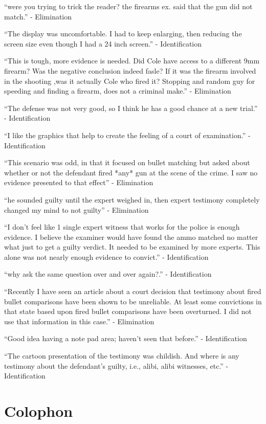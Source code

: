 \documentclass[print]{nuthesis}
\begin{document}
``were you trying to trick the reader? the firearms ex. said that the gun did not match.'' - Elimination

``The display was uncomfortable. I had to keep enlarging, then reducing the screen size even though I had a 24 inch screen.'' - Identification

``This is tough, more evidence is needed. Did Cole have access to a different 9mm firearm? Was the negative conclusion indeed fasle? If it was the firearm involved in the shooting ,was it actually Cole who fired it? Stopping and random guy for speeding and finding a firearm, does not a criminal make.'' - Elimination

``The defense was not very good, so I think he has a good chance at a new trial.'' - Identification

``I like the graphics that help to create the feeling of a court of examination.'' - Identification

``This scenario was odd, in that it focused on bullet matching but asked about whether or not the defendant fired *any* gun at the scene of the crime. I saw no evidence presented to that effect'' - Elimination

``he sounded guilty until the expert weighed in, then expert testimony completely changed my mind to not guilty'' - Elimination

``I don't feel like 1 single expert witness that works for the police is enough evidence. I believe the examiner would have found the ammo matched no matter what just to get a guilty verdict. It needed to be examined by more experts. This alone was not nearly enough evidence to convict.'' - Identification

``why ask the same question over and over again?.'' - Identification

``Recently I have seen an article about a court decision that testimony about fired bullet comparisons have been shown to be unreliable. At least some convictions in that state based upon fired bullet comparisons have been overturned. I did not use that information in this case.'' - Elimination

``Good idea having a note pad area; haven't seen that before.'' - Identification

``The cartoon presentation of the testimony was childish. And where is any testimony about the defendant's guilty, i.e., alibi, alibi witnesses, etc.'' - Identification

\hypertarget{colophon}{%
\chapter*{Colophon}\label{colophon}}
\end{document}
